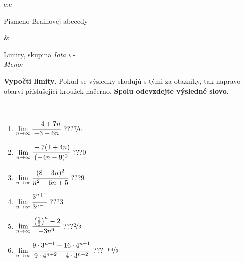 \documentclass[10pt]{report}
\begin{document}
\begin{tabular}{c:c}
\begin{minipage}[c][104.5mm][t]{0.5\linewidth}
\begin{center}
\begin{minipage}{0.20\linewidth}
\begin{center}
{\small Písmeno Braillovej abecedy}
\end{center}
\end{minipage}
\end{center}
\end{minipage}
&
\begin{minipage}[c][104.5mm][t]{0.5\linewidth}
\begin{center}
\vspace{7mm}
{\huge Limity, skupina \textit{Iota $\iota$} -}\\[5mm]
\textit{Meno:}\phantom{xxxxxxxxxxxxxxxxxxxxxxxxxxxxxxxxxxxxxxxxxxxxxxxxxxxxxxxxxxxxxxxxx}\\[5mm]
\begin{minipage}{0.95\linewidth}
\begin{center}
\textbf{Vypočti limity}. Pokud se výsledky shodujú s tými za otazníky, tak napravo\\obarvi příslušející kroužek načerno. \textbf{Spolu odevzdejte výsledné slovo}.
\end{center}
\end{minipage}
\\[1mm]
\begin{minipage}{0.79\linewidth}
\begin{center}
\begin{varwidth}{\linewidth}
\begin{enumerate}
\normalsize
\item $\lim\limits_{n\to\infty}\cfrac{-4+7n}{-3+6n}$\quad \dotfill\; ???\;\dotfill \quad $\nicefrac{7}{6}$
\item $\lim\limits_{n\to\infty}\cfrac{-7(1+4n)}{(-4n-9)^2}$\quad \dotfill\; ???\;\dotfill \quad $0$
\item $\lim\limits_{n\to\infty}\cfrac{(8-3n)^2}{n^2-6n+5}$\quad \dotfill\; ???\;\dotfill \quad $9$
\item $\lim\limits_{n\to\infty}\cfrac{3^{n+1}}{3^{n-1}}$\quad \dotfill\; ???\;\dotfill \quad $3$
\item $\lim\limits_{n\to\infty}\cfrac{\left(\frac{1}{2}\right)^n -2}{-3n^{6}}$\quad \dotfill\; ???\;\dotfill \quad $\nicefrac{2}{3}$
\item $\lim\limits_{n\to\infty}\cfrac{9\cdot 3^{n+1}-16\cdot 4^{n+1}}{9\cdot 4^{n+2}-4\cdot 3^{n+2}}$\quad \dotfill\; ???\;\dotfill \quad $\nicefrac{-64}{9}$
\end{enumerate}
\end{varwidth}
\end{center}
\end{minipage}

\end{center}
\end{minipage}
\end{tabular}
\end{document}
